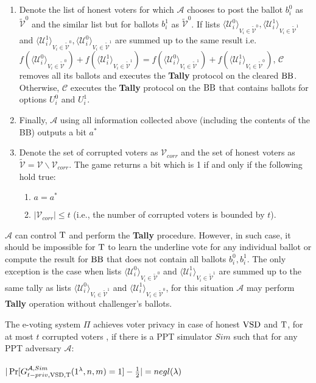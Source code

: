 \begin{enumerate}
\item Denote the list of honest voters for which $\mathcal{A}$ chooses to post the ballot  $b_i^0$  as $ \tilde{\mathcal{V}}^0$ and the similar list but for ballots $b_i^1$ as $ \tilde{\mathcal{V}}^0$.  If  lists $\langle \mathcal{U}^0_i \rangle _{V_i \in \tilde{\mathcal{V}}^0}, \langle \mathcal{U}^1_i \rangle _{V_i \in \tilde{\mathcal{V}}^1}$ and $\langle \mathcal{U}^1_i \rangle _{V_i \in \tilde{\mathcal{V}}^0}, \langle \mathcal{U}^0_i \rangle _{V_i \in \tilde{\mathcal{V}}^1}$ are summed up to the same result i.e. $f(\langle \mathcal{U}^0_i \rangle _{V_i \in \tilde{\mathcal{V}}^0} ) + f(\langle \mathcal{U}^1_i \rangle _{V_i \in \tilde{\mathcal{V}}^1} ) =  f(\langle \mathcal{U}^0_i \rangle _{V_i \in \tilde{\mathcal{V}}^1} ) +  f(\langle \mathcal{U}^1_i \rangle _{V_i \in \tilde{\mathcal{V}}^0} )$, $\mathcal{C}$ removes all its ballots and executes the \textbf{Tally} protocol on the cleared $\operatorname{BB}$. Otherwise, $\mathcal{C}$ executes the \textbf{Tally} protocol on the $\operatorname{BB}$ that contains ballots for options $U_i^0$ and $U_i^1$. 
\item Finally, $\mathcal{A}$ using all information collected above (including the contents of the BB) outputs a bit $a^*$
\item Denote the set of corrupted voters as $\mathcal{V}_{corr}$ and the set of honest voters as $\tilde{\mathcal{V}}= \mathcal{V} \backslash \mathcal{V}_{corr}$. The game returns a bit which is 1 if and only if the following hold true:
\begin{enumerate}
 \item $a = a^*$
 \item $|\mathcal{V}_{corr}| \leq t$ (i.e., the number of corrupted voters is bounded by $t$).
\end{enumerate}
\end{enumerate}
\begin{remark}
$\mathcal{A}$ can control $\operatorname{T}$ and perform the \textbf{Tally} procedure. However, in such case, it should be impossible for $\operatorname{T}$ to learn the underline vote for any individual ballot or compute the result for $\operatorname{BB}$ that does not contain all ballots $b_i^0,b_i^1$. The only exception is the case when lists  $\langle \mathcal{U}^0_i \rangle _{V_i \in \tilde{\mathcal{V}}^0} $ and  $\langle \mathcal{U}^1_i \rangle _{V_i \in \tilde{\mathcal{V}}^1} $ are summed up to the same tally as lists  $\langle \mathcal{U}^0_i \rangle _{V_i \in \tilde{\mathcal{V}}^1} $ and  $\langle \mathcal{U}^1_i \rangle _{V_i \in \tilde{\mathcal{V}}^0} $, for this situation $\mathcal{A}$ may perform \textbf{Tally} operation without challenger's ballots. 
\end{remark}
\begin{definition}
The e-voting system $\Pi$ achieves voter privacy in case of honest $\operatorname{VSD}$ and $\operatorname{T}$, for at most $t$ corrupted voters , if there is a PPT simulator $Sim$ such that for any PPT adversary $\mathcal{A}$:\\\\
 $|\Pr[G_{t-priv,\operatorname{VSD},\operatorname{T}}^{\mathcal{A},Sim}(1^{\lambda},n,m) = 1] - \frac{1}{2}| = negl(\lambda)$
 \end{definition}
